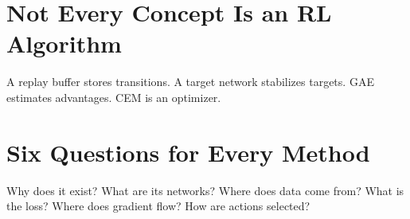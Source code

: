 \section{Not Every Concept Is an RL Algorithm}
A replay buffer stores transitions. A target network stabilizes targets. GAE estimates advantages. CEM is an optimizer.
\section{Six Questions for Every Method}
Why does it exist? What are its networks? Where does data come from? What is the loss? Where does gradient flow? How are actions selected?